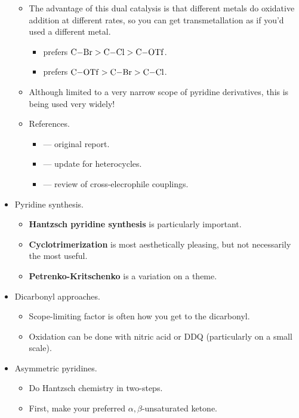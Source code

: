 \documentclass[../notes.tex]{subfiles}
\begin{document}
\begin{itemize}
\begin{itemize}
\begin{itemize}
        \end{itemize}
        \item The advantage of this dual catalysis is that different metals do oxidative addition at different rates, so you can get transmetallation as if you'd used a different metal.
        \begin{itemize}
            \item {} prefers $\ce{C-Br}>\ce{C-Cl}>\ce{C-OTf}$.
            \item {} prefers $\ce{C-OTf}>\ce{C-Br}>\ce{C-Cl}$.
        \end{itemize}
        \item Although limited to a very narrow scope of pyridine derivatives, this is being used very widely!
        \item References.
        \begin{itemize}
            \item \textcite{bib:Weix1} --- original report.
            \item \textcite{bib:Weix2} --- update for heterocycles.
            \item \textcite{bib:Weix3} --- review of cross-elecrophile couplings.
        \end{itemize}
    \end{itemize}
    \item Pyridine synthesis.
    \begin{itemize}
        \item \textbf{Hantzsch pyridine synthesis} is particularly important.
        \item \textbf{Cyclotrimerization} is most aesthetically pleasing, but not necessarily the most useful.
        \item \textbf{Petrenko-Kritschenko} is a variation on a theme.
    \end{itemize}
    \item Dicarbonyl approaches.
    \begin{itemize}
        \item Scope-limiting factor is often how you get to the dicarbonyl.
        \item Oxidation can be done with nitric acid or DDQ (particularly on a small scale).
    \end{itemize}
    \item Asymmetric pyridines.
    \begin{itemize}
        \item Do Hantzsch chemistry in two-steps.
        \item First, make your preferred $\alpha,\beta$-unsaturated ketone.

\end{itemize}
\end{itemize}
\end{document}
